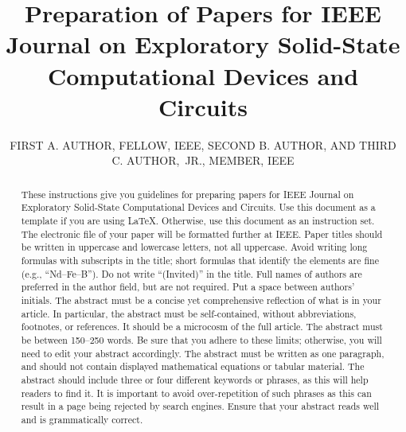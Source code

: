 \documentclass{IEEEoj}
\begin{document}

\title{\textcolor{ojcolor2}{Preparation of Papers for IEEE Journal
on Exploratory Solid-State Computational Devices and Circuits}}

\author{FIRST A. AUTHOR, FELLOW, IEEE, SECOND B.
AUTHOR, AND THIRD C. AUTHOR,~JR.,
MEMBER, IEEE}

\begin{abstract}
These instructions give you guidelines for preparing papers for IEEE Journal on Exploratory Solid-State Computational Devices and Circuits. Use this document as a template if you are using \LaTeX. Otherwise, use this document as an instruction set. The electronic file of your paper will be formatted further at IEEE. Paper titles should be written in uppercase and lowercase letters, not all uppercase. Avoid writing long formulas with subscripts in the title; short formulas that identify the elements are fine (e.g., {``}Nd{--}Fe{--}B{''}). Do not write {``}(Invited){''} in the title. Full names of authors are preferred in the author field, but are not required. Put a space between authors{'} initials. The abstract must be a concise yet comprehensive reflection of what is in your article. In particular, the abstract must be self-contained, without abbreviations, footnotes, or references. It should be a microcosm of the full article. The abstract must be between 150{--}250 words. Be sure that you adhere to these limits; otherwise, you will need to edit your abstract accordingly. The abstract must be written as one paragraph, and should not contain displayed mathematical equations or tabular material. The abstract should include three or four different keywords or phrases, as this will help readers to find it. It is important to avoid over-repetition of such phrases as this can result in a page being rejected by search engines. Ensure that your abstract reads well and is grammatically correct.
\end{abstract}
\end{document}
